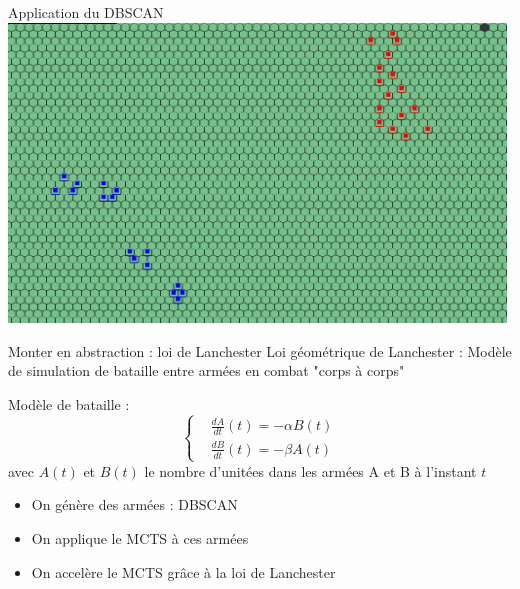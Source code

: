 \documentclass[french]{beamer}
\begin{document}
\begin{frame}{Application du DBSCAN}
	\centering
	\includegraphics[width=0.99\textwidth]{groupes screen.jpg}
\end{frame}
\begin{frame}{Monter en abstraction : loi de Lanchester}
Loi géométrique de Lanchester : Modèle de simulation de bataille entre armées en combat "corps à corps"

Modèle de bataille : 
\begin{equation*}
	\left\{
	\begin{aligned}
		&\frac{dA}{dt}(t) =-\alpha B(t)\\
		&\frac{dB}{dt}(t) =-\beta A(t)
	\end{aligned}
	\right.
\end{equation*}
avec $A(t)$ et $B(t)$ le nombre d'unitées dans les armées A et B à l'instant $t$
	
\begin{itemize}
	\item On génère des armées : DBSCAN
	\item On applique le MCTS à ces armées
	\item On accelère le MCTS grâce à la loi de Lanchester
\end{itemize}
	
	
	
\end{frame}
\end{document}
